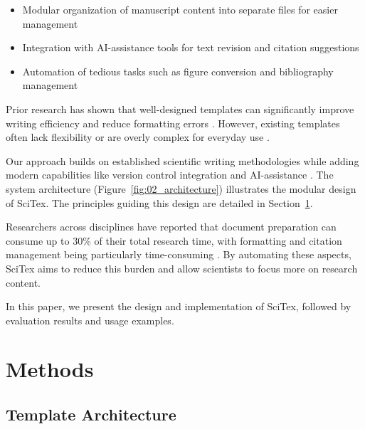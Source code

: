 \documentclass[preprint,review,12pt]{elsarticle}%
\begin{document}
\begin{frontmatter}
\begin{itemize}
    \item Modular organization of manuscript content into separate files for easier management
    \item Integration with AI-assistance tools for text revision and citation suggestions
    \item Automation of tedious tasks such as figure conversion and bibliography management
\end{itemize}

Prior research has shown that well-designed templates can significantly improve writing efficiency and reduce formatting errors \cite{Williams2021}. However, existing templates often lack flexibility or are overly complex for everyday use \cite{Garcia2019}.

Our approach builds on established scientific writing methodologies while adding modern capabilities like version control integration and AI-assistance \cite{Taylor2022}. The system architecture (Figure~\ref{fig:02_architecture}) illustrates the modular design of SciTex. The principles guiding this design are detailed in Section~\ref{sec:methods}.


Researchers across disciplines have reported that document preparation can consume up to 30\% of their total research time, with formatting and citation management being particularly time-consuming \cite{Lee2018}. By automating these aspects, SciTex aims to reduce this burden and allow scientists to focus more on research content.

In this paper, we present the design and implementation of SciTex, followed by evaluation results and usage examples.


\section{Methods}
\label{sec:methods}


\subsection{Template Architecture}
\label{subsec:architecture}


\end{frontmatter}
\end{document}
